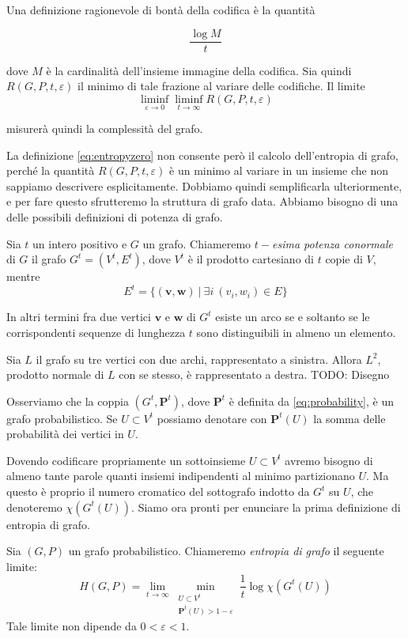 Una definizione ragionevole di bontà della codifica è la quantità

\[\frac{\log{M}}{t}\]

dove \(M\) è la cardinalità dell'insieme immagine della codifica. Sia quindi \(R(G,P,t,\varepsilon)\) il minimo di tale frazione al variare delle codifiche. Il limite 
\begin{equation}
	\label{eq:entropyzero} \liminf_{\varepsilon \to 0} \liminf_{t \to \infty} R(G,P,t,\varepsilon) 
\end{equation}

misurerà quindi la complessità del grafo.

La definizione \eqref{eq:entropyzero} non consente però il calcolo dell'entropia di grafo, perché la quantità \(R(G,P,t,\varepsilon)\) è un minimo al variare in un insieme che non sappiamo descrivere esplicitamente. Dobbiamo quindi semplificarla ulteriormente, e per fare questo sfrutteremo la struttura di grafo data. Abbiamo bisogno di una delle possibili definizioni di potenza di grafo. 
\begin{definition}
	Sia \(t\) un intero positivo e \(G\) un grafo. Chiameremo \emph{\(t-\)esima potenza conormale} di \(G\) il grafo \(G^t=(V^t, E^t)\), dove \(V^t\) è il prodotto cartesiano di \(t\) copie di \(V\), mentre
	\[E^t=\{(\mathbf{v},\mathbf{w})\ \vert\ \exists i\ (v_i, w_i)\in E\}\]
\end{definition}

In altri termini fra due vertici \(\mathbf{v}\) e \(\mathbf{w}\) di \(G^t\) esiste un arco se e soltanto se le corrispondenti sequenze di lunghezza \(t\) sono distinguibili in almeno un elemento.
\begin{example}
	Sia \(L\) il grafo su tre vertici con due archi, rappresentato a sinistra. Allora \(L^2\), prodotto normale di \(L\) con se stesso, è rappresentato a destra. TODO: Disegno 
\end{example}
Osserviamo che la coppia \((G^t, \mathbf{P}^t)\), dove \(\mathbf{P}^t\) è definita da \eqref{eq:probability}, è un grafo probabilistico. Se \(U\subset V^{t}\) possiamo denotare con \(\mathbf{P}^t(U)\) la somma delle probabilità dei vertici in \(U\).

Dovendo codificare propriamente un sottoinsieme \(U\subset V^{t}\) avremo bisogno di almeno tante parole quanti insiemi indipendenti al minimo partizionano \(U\). Ma questo è proprio il numero cromatico del sottografo indotto da \(G^t\) su \(U\), che denoteremo \(\chi(G^t(U))\). Siamo ora pronti per enunciare la prima definizione di entropia di grafo. 
\begin{definition}
	Sia \((G,P)\) un grafo probabilistico. Chiameremo \emph{entropia di grafo} il seguente limite: 
	\begin{equation}
		\label{eq:entropyone} H(G,P)=\lim_{t\to \infty} \min_{\substack{ U\subset V^t\\\mathbf{P}^t(U)>1-\varepsilon}} \frac{1}{t}\log{\chi(G^t(U))} 
	\end{equation}
	Tale limite non dipende da \(0<\varepsilon <1\). 
\end{definition}


